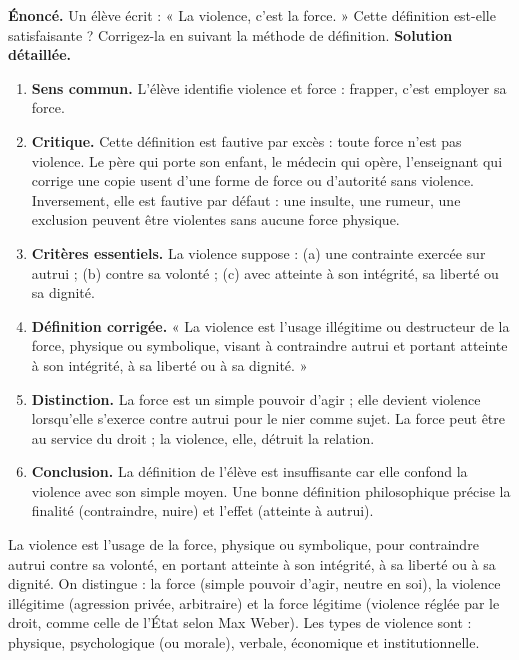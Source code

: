 \documentclass[11pt]{article}
\newcommand{\cle}[1]{{\popxbold\color{popdark}#1}}
\begin{document}
\begin{exoresolu}
\textbf{Énoncé.} Un élève écrit : « La violence, c'est la force. » Cette définition est-elle satisfaisante ? Corrigez-la en suivant la méthode de définition.
\tcblower
\textbf{Solution détaillée.}
\begin{enumerate}
\item \textbf{Sens commun.} L'élève identifie violence et force : frapper, c'est employer sa force.
\item \textbf{Critique.} Cette définition est fautive par excès : toute force n'est pas violence. Le père qui porte son enfant, le médecin qui opère, l'enseignant qui corrige une copie usent d'une forme de force ou d'autorité sans violence. Inversement, elle est fautive par défaut : une insulte, une rumeur, une exclusion peuvent être violentes sans aucune force physique.
\item \textbf{Critères essentiels.} La violence suppose : (a) une contrainte exercée sur autrui ; (b) contre sa volonté ; (c) avec atteinte à son intégrité, sa liberté ou sa dignité.
\item \textbf{Définition corrigée.} « La violence est l'usage illégitime ou destructeur de la force, physique ou symbolique, visant à contraindre autrui et portant atteinte à son intégrité, à sa liberté ou à sa dignité. »
\item \textbf{Distinction.} La \cle{force} est un simple pouvoir d'agir ; elle devient \cle{violence} lorsqu'elle s'exerce contre autrui pour le nier comme sujet. La force peut être au service du droit ; la violence, elle, détruit la relation.
\item \textbf{Conclusion.} La définition de l'élève est insuffisante car elle confond la violence avec son simple moyen. Une bonne définition philosophique précise la finalité (contraindre, nuire) et l'effet (atteinte à autrui).
\end{enumerate}
\end{exoresolu}

\begin{aretenir}
La \cle{violence} est l'usage de la force, physique ou symbolique, pour contraindre autrui contre sa volonté, en portant atteinte à son intégrité, à sa liberté ou à sa dignité. On distingue : la \cle{force} (simple pouvoir d'agir, neutre en soi), la \cle{violence illégitime} (agression privée, arbitraire) et la \cle{force légitime} (violence réglée par le droit, comme celle de l'État selon Max Weber). Les types de violence sont : physique, psychologique (ou morale), verbale, économique et institutionnelle.
\end{aretenir}
\end{document}
